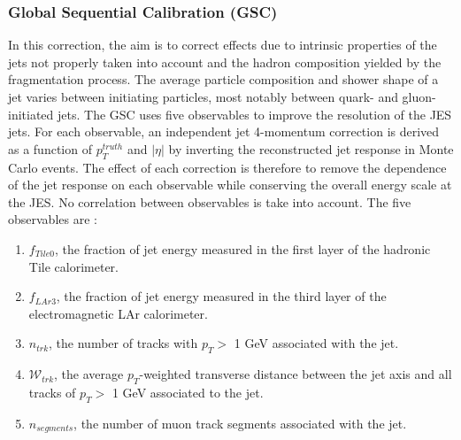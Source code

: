 \subsubsection{Global Sequential Calibration (GSC)}
\label{Jet:Cal:chain:GSC}
In this correction, the aim is to correct effects due to intrinsic properties of the jets not properly taken into account and the hadron composition yielded by the fragmentation process. The average particle composition and shower shape of a jet varies between initiating particles, most notably between quark- and gluon-initiated jets. The GSC uses five observables to improve the resolution of the JES jets. For each observable, an independent jet 4-momentum correction is derived as a function of $p_{T}^{truth}$ and $|\eta|$ by inverting the reconstructed jet response in Monte Carlo events. The effect of each correction is therefore to remove the dependence of the jet response on each observable while conserving the overall energy scale at the JES. No correlation between observables is take into account. The five observables are : 
\begin{enumerate}
    \item $f_{Tile0}$, the fraction of jet energy measured in the first layer of the hadronic Tile calorimeter.
    \item $f_{LAr3}$, the fraction of jet energy measured in the third layer of the electromagnetic LAr calorimeter.
    \item $n_{trk}$, the number of tracks with $p_T>$ 1 GeV associated with the jet.
    \item $\mathcal{W}_{trk}$, the average $p_T$-weighted transverse distance between the jet axis and all tracks of $p_T>$ 1 GeV associated to the jet.
    \item $n_{segments}$, the number of muon track segments associated with the jet.
\end{enumerate}
